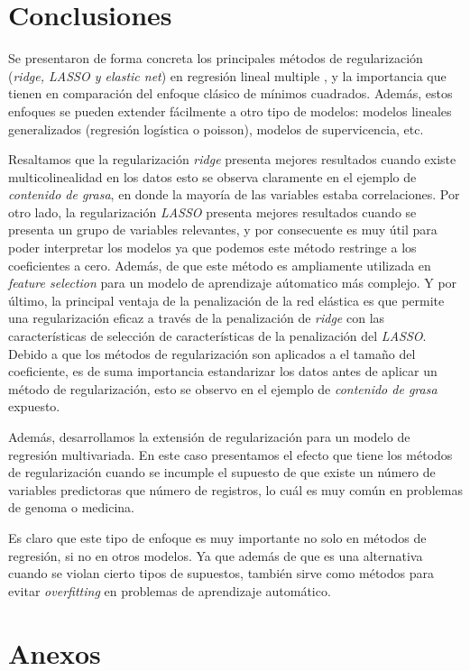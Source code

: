 \documentclass{article}
\begin{document}
\section{Conclusiones}
Se presentaron de forma concreta los principales métodos de regularización (\textit{ridge, LASSO y elastic net}) en regresión lineal multiple , y la importancia que tienen en comparación del enfoque clásico de mínimos cuadrados. Además, estos enfoques se pueden extender fácilmente a otro tipo de modelos: modelos lineales generalizados (regresión logística o poisson), modelos de supervicencia, etc.

Resaltamos que la regularización \textit{ridge} presenta mejores resultados cuando existe multicolinealidad en los datos esto se observa claramente en el ejemplo de \textit{contenido de grasa}, en donde la mayoría de las variables estaba correlaciones. Por otro lado, la regularización \textit{LASSO} presenta mejores resultados cuando se presenta un grupo de variables relevantes, y por consecuente es muy útil para poder interpretar los modelos ya que podemos este método restringe a los coeficientes a cero. Además, de que este método es ampliamente utilizada en \textit{feature selection} para un modelo de aprendizaje aútomatico más complejo. Y por último, la principal ventaja de la penalización de la red elástica es que permite una regularización eficaz a través de la penalización de \textit{ridge} con las características de selección de características de la penalización del \textit{LASSO}. Debido a que los métodos de regularización son aplicados a el tamaño del coeficiente, es de suma importancia estandarizar los datos antes de aplicar un método de regularización, esto se observo en el ejemplo de \textit{contenido de grasa} expuesto.


Además, desarrollamos la extensión de regularización para un modelo de regresión multivariada. En este caso presentamos el efecto que tiene los métodos de regularización cuando se incumple el supuesto de que existe un número de variables predictoras que número de registros, lo cuál es muy común en problemas de genoma o medicina.   

Es claro que este tipo de enfoque es muy importante no solo en métodos de regresión, si no en otros modelos. Ya que además de que es una alternativa cuando se violan cierto tipos de supuestos, también sirve como métodos para evitar \textit{overfitting} en problemas de aprendizaje automático. 

\section{Anexos}
\end{document}
